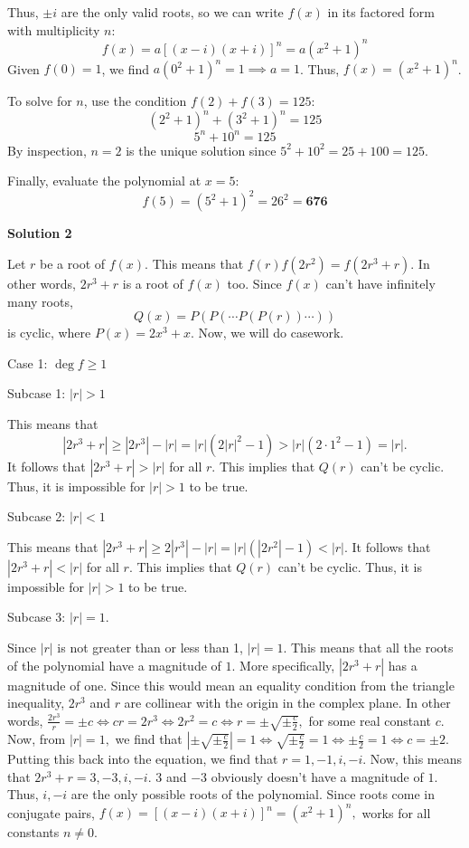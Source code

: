 \begin{enumerate}
 Thus, $\pm i$ are the only valid roots, so we can write $f(x)$ in its factored form with multiplicity $n$:
 \[f(x) = a[(x-i)(x+i)]^n = a(x^2+1)^n\]Given $f(0) = 1$, we find $a(0^2+1)^n = 1 \implies a = 1$. Thus, $f(x) = (x^2+1)^n$.

 To solve for $n$, use the condition $f(2) + f(3) = 125$:
 \[(2^2+1)^n + (3^2+1)^n = 125\]
 \[5^n + 10^n = 125\]By inspection, $n=2$ is the unique solution since $5^2 + 10^2 = 25 + 100 = 125$.

 Finally, evaluate the polynomial at $x = 5$:
 \[f(5) = (5^2+1)^2 = 26^2 = \mathbf{676}\]




\textbf{Solution 2}

Let $r$ be a root of $f(x).$ This means that $f(r)f(2r^2)=f(2r^3+r).$ In other words, $2r^3+r$ is a root of $f(x)$ too. Since $f(x)$ can't have infinitely many roots, 
 \[Q(x)=P(P(\dotsb P(P(r)) \dotsb))\] is cyclic, where $P(x)=2x^3+x.$ Now, we will do casework.

 Case 1: $\deg f\geq1$

 Subcase 1: $|r|>1$

 This means that 
 \[|2r^3+r|\geq|2r^3|-|r|=|r|(2|r|^2-1)>|r|(2\cdot1^2-1)=|r|.\] It follows that $|2r^3+r|>|r|$ for all $r.$ This implies that $Q(r)$ can't be cyclic. Thus, it is impossible for $|r|>1$ to be true.

 Subcase 2: $|r|<1$

 This means that $|2r^3+r|\geq2|r^3|-|r|=|r|(|2r^2|-1)<|r|.$ It follows that $|2r^3+r|<|r|$ for all $r.$ This implies that $Q(r)$ can't be cyclic. Thus, it is impossible for $|r|>1$ to be true.

 Subcase 3: $|r|=1.$ 

 Since $|r|$ is not greater than or less than 1, $|r|=1.$ This means that all the roots of the polynomial have a magnitude of $1.$ More specifically, $|2r^3+r|$ has a magnitude of one. Since this would mean an equality condition from the triangle inequality, $2r^3$ and $r$ are collinear with the origin in the complex plane. In other words, $\frac{2r^3}{r}=\pm c\Leftrightarrow cr=2r^3\Leftrightarrow 2r^2=c\Leftrightarrow r=\pm\sqrt{\pm\frac{c}{2}},$ for some real constant $c.$ Now, from $|r|=1,$ we find that $\left|\pm\sqrt{\pm\frac{c}{2}}\right|=1\Leftrightarrow \sqrt{\pm\frac{c}{2}}=1\Leftrightarrow \pm\frac{c}{2}=1\Leftrightarrow c=\pm2.$ Putting this back into the equation, we find that $r=1,-1,i,-i.$ Now, this means that $2r^3+r=3,-3,i,-i.$ $3$ and $-3$ obviously doesn't have a magnitude of $1.$ Thus, $i,-i$ are the only possible roots of the polynomial. Since roots come in conjugate pairs, $f(x)=[(x-i)(x+i)]^n=(x^2+1)^n,$ works for all constants $n\neq0.$


\end{enumerate}

